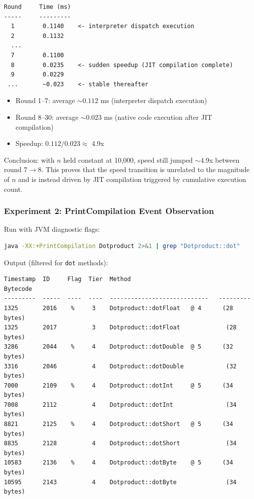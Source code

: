 \documentclass[12pt,a4paper]{article}
\begin{document}
\begin{lstlisting}
Round     Time (ms)
-----     ---------
  1        0.1140    <- interpreter dispatch execution
  2        0.1132
  ...
  7        0.1100
  8        0.0235    <- sudden speedup (JIT compilation complete)
  9        0.0229
 ...       ~0.023    <- stable thereafter
\end{lstlisting}

\begin{itemize}
  \item Round 1--7: average ${\sim}0.112$ ms (interpreter dispatch execution)
  \item Round 8--30: average ${\sim}0.023$ ms (native code execution after JIT compilation)
  \item Speedup: $0.112 / 0.023 \approx$ 4.9x
\end{itemize}

Conclusion: with $n$ held constant at 10{,}000, speed still jumped ${\sim}$4.9x between round 7$\to$8. This proves that the speed transition is unrelated to the magnitude of $n$ and is instead driven by JIT compilation triggered by cumulative execution count.

\subsubsection{Experiment 2: PrintCompilation Event Observation}

Run with JVM diagnostic flags:

\begin{lstlisting}[language=bash]
java -XX:+PrintCompilation Dotproduct 2>&1 | grep "Dotproduct::dot"
\end{lstlisting}

Output (filtered for \texttt{dot} methods):

\begin{lstlisting}
Timestamp  ID     Flag  Tier  Method                           Bytecode
---------  -----  ----  ----  ----------------------------   ---------
1325       2016    %     3    Dotproduct::dotFloat   @ 4      (28 bytes)
1325       2017          3    Dotproduct::dotFloat             (28 bytes)
3286       2044    %     4    Dotproduct::dotDouble  @ 5      (32 bytes)
3316       2046          4    Dotproduct::dotDouble            (32 bytes)
7000       2109    %     4    Dotproduct::dotInt     @ 5      (34 bytes)
7008       2112          4    Dotproduct::dotInt               (34 bytes)
8821       2125    %     4    Dotproduct::dotShort   @ 5      (34 bytes)
8835       2128          4    Dotproduct::dotShort             (34 bytes)
10583      2136    %     4    Dotproduct::dotByte    @ 5      (34 bytes)
10595      2143          4    Dotproduct::dotByte              (34 bytes)
\end{lstlisting}
\end{document}

